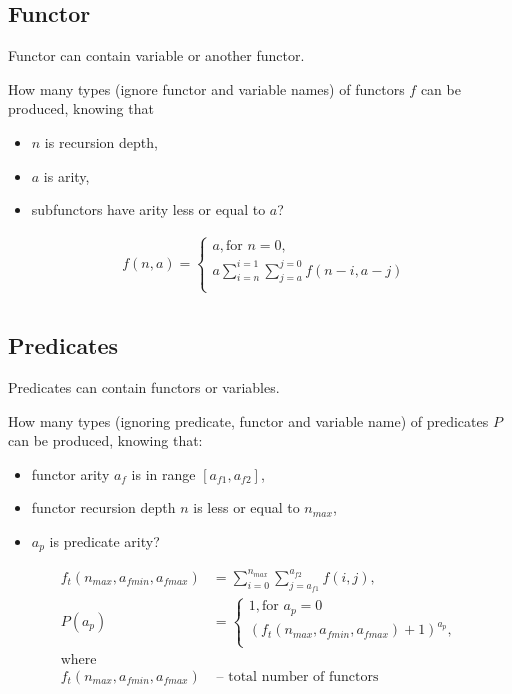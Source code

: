 \subsection{Functor}

Functor can contain variable or another functor.

How many types (ignore functor and variable names) of functors $f$ can be produced, knowing that
\begin{itemize}
	\item $n$ is recursion depth,
	\item $a$ is arity,
	\item subfunctors have arity less or equal to $a$?
\end{itemize}


\begin{align*}
	&f(n, a) =
	\begin{cases}
		a, \text{for } n = 0, \\
		a \sum_{i=n}^{i=1} \sum_{j=a}^{j=0} f(n-i,a-j) \\
	\end{cases} \\
\end{align*}

\subsection{Predicates}

Predicates can contain functors or variables.

How many types (ignoring predicate, functor and variable name) of predicates $P$ can be produced, knowing that:
\begin{itemize}
	\item functor arity $a_f$ is in range $[a_{f1}, a_{f2}]$,
	\item functor recursion depth $n$ is less or equal to $n_{max}$,
	\item $a_p$ is predicate arity?
\end{itemize}

\begin{align*}
	f_t(n_{max}, a_{fmin}, a_{fmax}) &= \sum_{i=0}^{n_{max}} \sum_{j=a_{f1}}^{a_{f2}} f(i, j), \\
	P(a_p) &=
	\begin{cases}
		1, \text{for } a_p = 0 \\
		(f_t(n_{max}, a_{fmin}, a_{fmax}) + 1)^{a_p}, \\
	\end{cases} \\
	\text{where} \\
	f_t(n_{max}, a_{fmin}, a_{fmax}) & \text{ -- total number of functors} \\
\end{align*}

